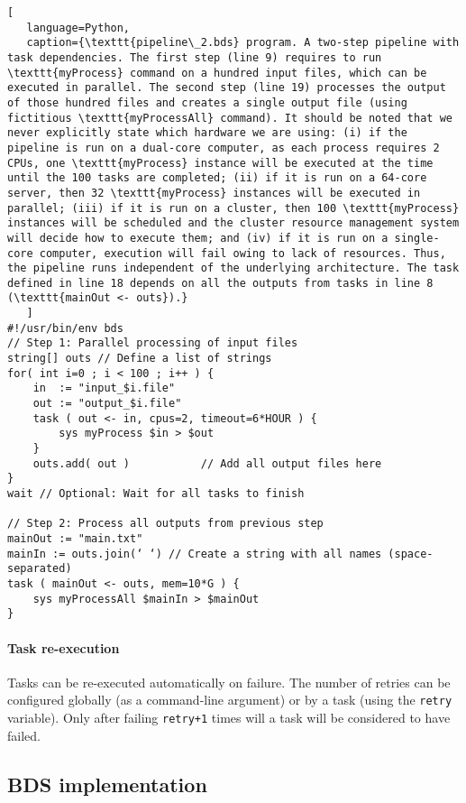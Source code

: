 \begin{lstlisting}[
   language=Python,
   caption={\texttt{pipeline\_2.bds} program. A two-step pipeline with task dependencies. The first step (line 9) requires to run \texttt{myProcess} command on a hundred input files, which can be executed in parallel. The second step (line 19) processes the output of those hundred files and creates a single output file (using fictitious \texttt{myProcessAll} command). It should be noted that we never explicitly state which hardware we are using: (i) if the pipeline is run on a dual-core computer, as each process requires 2 CPUs, one \texttt{myProcess} instance will be executed at the time until the 100 tasks are completed; (ii) if it is run on a 64-core server, then 32 \texttt{myProcess} instances will be executed in parallel; (iii) if it is run on a cluster, then 100 \texttt{myProcess} instances will be scheduled and the cluster resource management system will decide how to execute them; and (iv) if it is run on a single-core computer, execution will fail owing to lack of resources. Thus, the pipeline runs independent of the underlying architecture. The task defined in line 18 depends on all the outputs from tasks in line 8 (\texttt{mainOut <- outs}).}
   ]
#!/usr/bin/env bds
// Step 1: Parallel processing of input files
string[] outs // Define a list of strings 
for( int i=0 ; i < 100 ; i++ ) {
    in  := "input_$i.file"
    out := "output_$i.file"
    task ( out <- in, cpus=2, timeout=6*HOUR ) {
        sys myProcess $in > $out
    }
    outs.add( out )           // Add all output files here
}
wait // Optional: Wait for all tasks to finish

// Step 2: Process all outputs from previous step
mainOut := "main.txt"
mainIn := outs.join(‘ ‘) // Create a string with all names (space-separated)
task ( mainOut <- outs, mem=10*G ) {
    sys myProcessAll $mainIn > $mainOut
}
\end{lstlisting}

\paragraph{Task re-execution} Tasks can be re-executed automatically on failure. The number of retries can be configured globally (as a command-line argument) or by a task (using the \texttt{retry} variable). Only after failing \texttt{retry+1} times will a task will be considered to have failed.

\subsection{BDS implementation}

